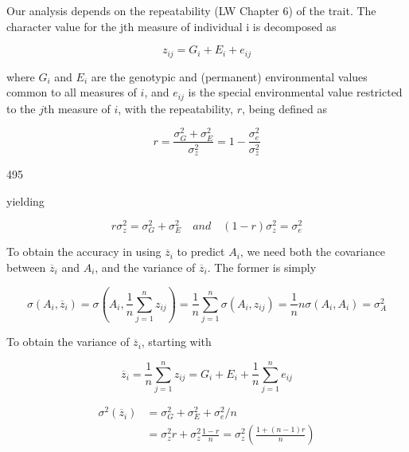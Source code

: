 \documentclass{article}
\begin{document}
Our analysis depends on the repeatability (LW Chapter 6) of the trait. The character value for the jth measure of individual i is decomposed as

\begin{equation}
z_{ij}=G_{i}+E_{i}+e_{ij}
\tag{13.16a}
\label{eq:13_16a}
\end{equation}

where  $ G_i $ and  $ E_i $ are the genotypic and (permanent) environmental values common to all measures of  $ i $, and  $ e_{ij} $ is the special environmental value restricted to the  $ j $th measure of  $ i $, with the repeatability,  $ r $, being defined as

\begin{equation}
r=\frac{\sigma_{G}^{2}+\sigma_{E}^{2}}{\sigma_{z}^{2}}=1-\frac{\sigma_{e}^{2}}{\sigma_{z}^{2}}
\tag{13.16b}
\label{eq:13_16b}
\end{equation}

495

yielding

\begin{equation}
r\sigma_{z}^{2}=\sigma_{G}^{2}+\sigma_{E}^{2}\quad and\quad(1-r)\sigma_{z}^{2}=\sigma_{e}^{2}
\tag{13.16c}
\label{eq:13_16c}
\end{equation}

To obtain the accuracy in using  $ \overline{z}_{i} $ to predict  $ A_{i} $, we need both the covariance between  $ \overline{z}_{i} $ and  $ A_{i} $, and the variance of  $ \overline{z}_{i} $. The former is simply

\begin{equation}
\sigma(A_{i},\overline{z}_{i})=\sigma\left(A_{i},\frac{1}{n}\sum_{j=1}^{n}z_{ij}\right)=\frac{1}{n}\sum_{j=1}^{n}\sigma(A_{i},z_{ij})=\frac{1}{n}n\sigma(A_{i},A_{i})=\sigma_{A}^{2}
\tag{13.17a}
\label{eq:13_17a}
\end{equation}

To obtain the variance of  $ \overline{z}_{i} $, starting with

\begin{equation}
\overline{z}_{i}=\frac{1}{n}\sum_{j=1}^{n}z_{ij}=G_{i}+E_{i}+\frac{1}{n}\sum_{j=1}^{n}e_{ij}
\tag{13.17b}
\label{eq:13_17b}
\end{equation}

\begin{equation}
\begin{aligned}\sigma^{2}\left(\overline{z}_{i}\right)&=\sigma_{G}^{2}+\sigma_{E}^{2}+\sigma_{e}^{2}/n\\&=\sigma_{z}^{2}r+\sigma_{z}^{2}\frac{1-r}{n}=\sigma_{z}^{2}\left(\frac{1+(n-1)r}{n}\right)\end{aligned}
\tag{13.17c}
\label{eq:13_17c}
\end{equation}
\end{document}
